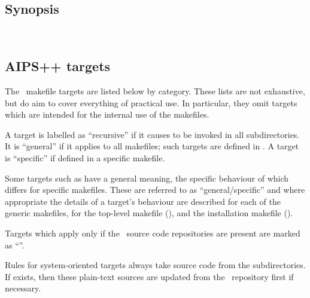 \subsection*{Synopsis}
 
\begin{synopsis}
   \\
\end{synopsis}
 
\subsection*{AIPS++ targets}

The \aipspp\ makefile targets are listed below by category.  These lists are
not exhaustive, but do aim to cover everything of practical use.  In
particular, they omit targets which are intended for the internal use of the
makefiles.

A target is labelled as ``recursive'' if it causes  to be
invoked in all subdirectories.  It is ``general'' if it applies to all
makefiles; such targets are defined in .  A target is
``specific'' if defined in a specific makefile.

Some targets such as  have a general meaning, the specific
behaviour of which differs for specific makefiles.  These are referred to as
``general/specific'' and where appropriate the details of a target's behaviour
are described for each of the generic makefiles, for the top-level makefile
(), and the installation makefile ().

Targets which apply only if the \rcs\ source code repositories are present are
marked as ``\rcs''.

Rules for system-oriented targets always take source code from the
 subdirectories.  If  exists, then these
plain-text sources are updated from the \rcs\ repository first if necessary.

